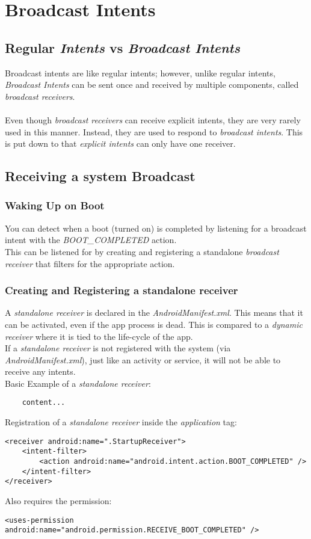 \documentclass[]{article}
\renewcommand{\it}[1]{\textit{#1}}
\begin{document}
\section{Broadcast Intents}
\subsection{Regular \it{Intents} vs \it{Broadcast Intents}}
Broadcast intents are like regular intents; however, unlike regular intents, \it{Broadcast Intents} can be sent once and received by multiple components, called \it{broadcast receivers}.
\\\\
Even though \it{broadcast receivers} can receive explicit intents, they are very rarely used in this manner.  Instead, they are used to respond to \it{broadcast intents}.  This is put down to that \it{explicit intents} can only have one receiver.

\subsection{Receiving a system Broadcast}
\subsubsection{Waking Up on Boot}
You can detect when a boot (turned on) is completed by listening for a broadcast intent with the \it{BOOT\_COMPLETED} action.
\\
This can be listened for by creating and registering a standalone \it{broadcast receiver} that filters for the appropriate action.

\subsubsection{Creating and Registering a standalone receiver}
A \it{standalone receiver} is declared in the \it{AndroidManifest.xml}.  This means that it can be activated, even if the app process is dead.  This is compared to a \it{dynamic receiver} where it is tied to the life-cycle of the app. 
\\
If a \it{standalone receiver} is not registered with the system (via \it{AndroidManifest.xml}), just like an activity or service, it will not be able to receive any intents.
\\
Basic Example of a \it{standalone receiver}:
\begin{lstlisting}
	content...
\end{lstlisting}
Registration of a \it{standalone receiver} inside the \it{application} tag:
\begin{lstlisting}
<receiver android:name=".StartupReceiver">
	<intent-filter>
		<action android:name="android.intent.action.BOOT_COMPLETED" />
	</intent-filter>
</receiver>
\end{lstlisting}
Also requires the permission:
\begin{lstlisting}
<uses-permission android:name="android.permission.RECEIVE_BOOT_COMPLETED" />
\end{lstlisting}
\end{document}
